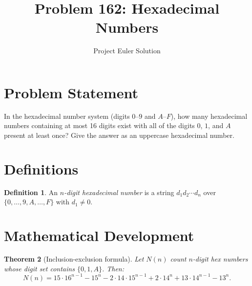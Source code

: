 \documentclass[12pt]{article}
\title{Problem 162: Hexadecimal Numbers}
\author{Project Euler Solution}
\date{}
\newtheorem{theorem}{Theorem}
\theoremstyle{definition}
\newtheorem{definition}[theorem]{Definition}
\begin{document}
\maketitle

\section{Problem Statement}
In the hexadecimal number system (digits $0$--$9$ and $A$--$F$), how many hexadecimal numbers containing at most 16 digits exist with all of the digits $0$, $1$, and $A$ present at least once? Give the answer as an uppercase hexadecimal number.

\section{Definitions}

\begin{definition}
An \emph{$n$-digit hexadecimal number} is a string $d_1 d_2 \cdots d_n$ over $\{0,\ldots,9,A,\ldots,F\}$ with $d_1 \neq 0$.
\end{definition}

\section{Mathematical Development}

\begin{theorem}[Inclusion-exclusion formula]
Let $N(n)$ count $n$-digit hex numbers whose digit set contains $\{0,1,A\}$. Then:
\[
N(n) = 15 \cdot 16^{n-1} - 15^n - 2 \cdot 14 \cdot 15^{n-1} + 2 \cdot 14^n + 13 \cdot 14^{n-1} - 13^n.
\]
\end{theorem}
\end{document}
